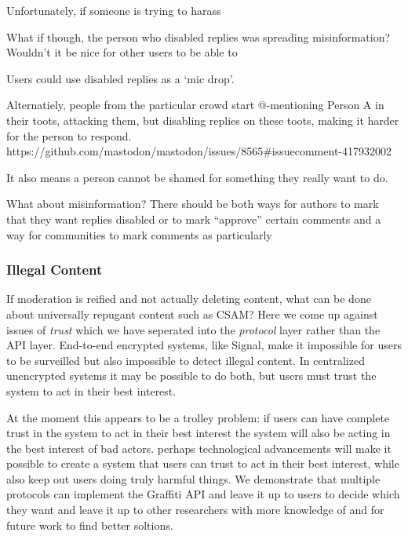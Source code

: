 Unfortunately, if someone is trying to harass

What if though, the person who disabled replies was spreading misinformation?
Wouldn't it be nice for other users to be able to

Users could use disabled replies as a `mic drop'.

Alternatiely,
people from the particular crowd start
@-mentioning Person A in their toots, attacking them,
but disabling replies on these toots, making it harder
for the person to respond.
https://github.com/mastodon/mastodon/issues/8565#issuecomment-417932002

It also means a person cannot be shamed for something they really
want to do.

What about misinformation? There should be both ways for authors to
mark that they want replies disabled or to mark ``approve'' certain comments
and a way for communities to
mark comments as particularly

\subsubsection{Illegal Content}

If moderation is reified and not actually deleting content,
what can be done about universally repugant content such as CSAM?
Here we come up against issues of \emph{trust} which we
have seperated into the \emph{protocol} layer rather than
the API layer.
End-to-end encrypted systems, like Signal, make it impossible
for users to be surveilled but also impossible to detect illegal content.
In centralized unencrypted systems it may be possible to do both, but
users must trust the system to act in their best interest.

At the moment this appears to be a trolley problem:
if users can have complete trust in the system to act in their
best interest the system will also be acting in the best interest
of bad actors.
perhaps technological advancements will make it possible to create
a system that users can trust to act in their best interest,
while also keep out users doing truly harmful things.
We demonstrate that multiple protocols can implement the
Graffiti API and leave it up to users to decide which they want
and leave it up to other researchers with more knowledge of
and for future work to find better soltions.



